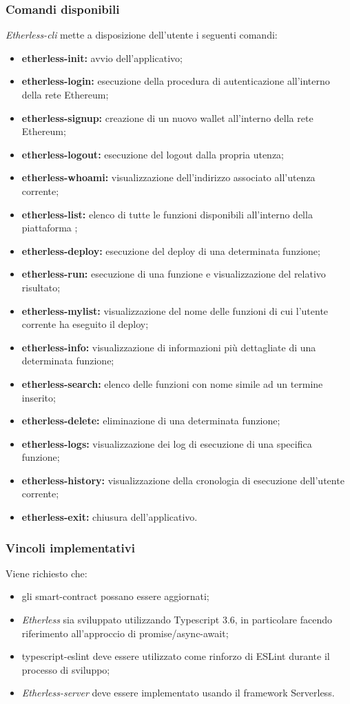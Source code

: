 \subsubsection{Comandi disponibili}
\textit{Etherless-cli} mette a disposizione dell'utente i seguenti comandi: 
\begin{itemize}
	\item \textbf{etherless-init:} avvio dell'applicativo; 
	\item \textbf{etherless-login:} esecuzione della procedura di autenticazione all'interno della rete Ethereum; 
	\item \textbf{etherless-signup:} creazione di un nuovo wallet all'interno della rete Ethereum; 
	\item \textbf{etherless-logout:} esecuzione del logout dalla propria utenza; 
	\item \textbf{etherless-whoami:} visualizzazione dell'indirizzo associato all'utenza corrente; 
	\item \textbf{etherless-list:} elenco di tutte le funzioni disponibili all'interno della piattaforma \NomeProgetto{}; 
	\item \textbf{etherless-deploy:} esecuzione del deploy di una determinata funzione;  
	\item \textbf{etherless-run:} esecuzione di una funzione e visualizzazione del relativo risultato; 
	\item \textbf{etherless-mylist:} visualizzazione del nome delle funzioni di cui l'utente corrente ha eseguito il deploy;  
	\item \textbf{etherless-info:} visualizzazione di informazioni più dettagliate di una determinata funzione; 
	\item \textbf{etherless-search:} elenco delle funzioni con nome simile ad un termine inserito; 
	\item \textbf{etherless-delete:} eliminazione di una determinata funzione;
	\item \textbf{etherless-logs:} visualizzazione dei log di esecuzione di una specifica funzione;
	\item \textbf{etherless-history:} visualizzazione della cronologia di esecuzione dell'utente corrente; 
	\item \textbf{etherless-exit:} chiusura dell'applicativo. 
\end{itemize}

\subsubsection{Vincoli implementativi}
Viene richiesto che:  
	\begin{itemize}
		\item gli smart-contract possano essere aggiornati; 
		\item \textit{Etherless} sia sviluppato utilizzando Typescript 3.6, in particolare facendo riferimento all'approccio di promise/async-await; 
		\item typescript-eslint deve essere utilizzato come rinforzo di ESLint durante il processo di sviluppo; 
		\item \textit{Etherless-server} deve essere implementato usando il framework Serverless. 
	\end{itemize}

